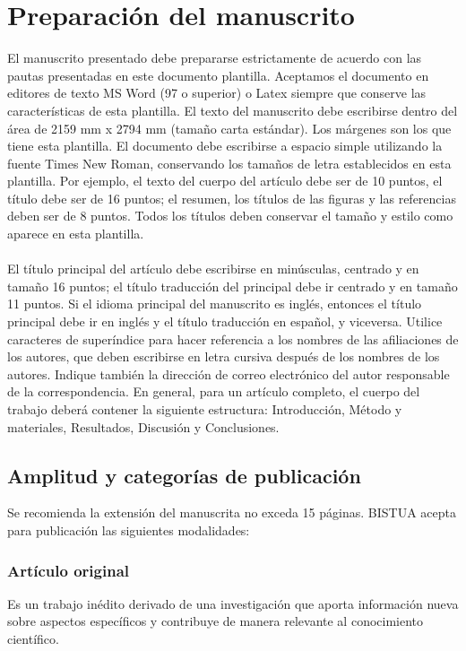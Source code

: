 \documentclass[10pt,letterpaper,twocolumn,twoside,fleqn]{article}
\begin{document}
\section{Preparación del manuscrito}\setlength{\parindent}{0cm}
El manuscrito presentado debe prepararse estrictamente de acuerdo con las pautas presentadas en este documento plantilla. Aceptamos el documento en editores de texto MS Word (97 o superior) o Latex siempre que conserve las características de esta plantilla. El texto del manuscrito debe escribirse dentro del área de 2159 mm x 2794 mm (tamaño carta estándar). Los márgenes son los que tiene esta plantilla. El documento debe escribirse a espacio simple utilizando la fuente Times New Roman, conservando los tamaños de letra establecidos en esta plantilla. Por ejemplo, el texto del cuerpo del artículo debe ser de 10 puntos, el título debe ser de 16 puntos; el resumen, los títulos de las figuras y las referencias deben ser de 8 puntos. Todos los títulos deben conservar el tamaño y estilo como aparece en esta plantilla.
\\\\
El título principal del artículo debe escribirse en minúsculas, centrado y en tamaño 16 puntos; el título traducción del principal debe ir centrado y en tamaño 11 puntos. Si el idioma principal del manuscrito es inglés, entonces el título principal debe ir en inglés y el título traducción en español, y viceversa. Utilice caracteres de superíndice para hacer referencia a los nombres de las afiliaciones de los autores, que deben escribirse en letra cursiva después de los nombres de los autores. Indique también la dirección de correo electrónico del autor responsable de la correspondencia. En general, para un artículo completo, el cuerpo del trabajo deberá contener la siguiente estructura: Introducción, Método y materiales, Resultados, Discusión y Conclusiones. 
\vspace*{-0.1cm}
\subsection{Amplitud y categorías de publicación}
Se recomienda la extensión del manuscrita no exceda 15 páginas. BISTUA acepta para publicación las siguientes modalidades:
\subsubsection{Artículo original}
Es un trabajo inédito derivado de una investigación que aporta información nueva sobre aspectos específicos y contribuye de manera relevante al conocimiento científico.
\end{document}
